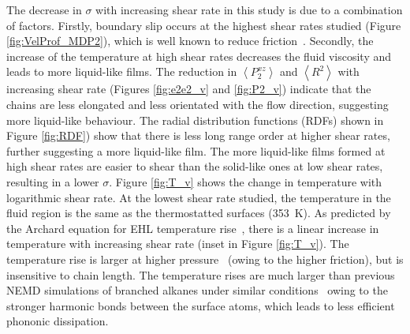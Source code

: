 \documentclass[5p]{elsarticle}
\begin{document}
The decrease in $\sigma$ with increasing shear rate in this study is due to a combination of factors. Firstly, boundary slip occurs at the highest shear rates studied (Figure \ref{fig:VelProf_MDP2}), which is well known to reduce friction~\cite{Sivebaek2010,Savio2012}. Secondly, the increase of the temperature at high shear rates decreases the fluid viscosity and leads to more liquid-like films. The reduction in $\left<P_{2}^{xz} \right> $ and $\left< R^2 \right>$ with increasing shear rate (Figures \ref{fig:e2e2_v} and \ref{fig:P2_v}) indicate that the chains are less elongated and less orientated with the flow direction, suggesting more liquid-like behaviour. The radial distribution functions (RDFs) shown in Figure \ref{fig:RDF}) show that there is less long range order at higher shear rates, further suggesting a more liquid-like film. The more liquid-like films formed at high shear rates are easier to shear than the solid-like ones at low shear rates, resulting in a lower $\sigma$. Figure \ref{fig:T_v} shows the change in temperature with logarithmic shear rate. At the lowest shear rate studied, the temperature in the fluid region is the same as the thermostatted surfaces (\SI{353}{\kelvin}). As predicted by the Archard equation for EHL temperature rise~\cite{Archard1959}, there is a linear increase in temperature with increasing shear rate (inset in Figure \ref{fig:T_v}). The temperature rise is larger at higher pressure~\cite{Archard1959} (owing to the higher friction), but is insensitive to chain length. The temperature rises are much larger than previous NEMD simulations of branched alkanes under similar conditions~\cite{Ewen2017a} owing to the stronger harmonic bonds between the surface atoms, which leads to less efficient phononic dissipation.
\end{document}

